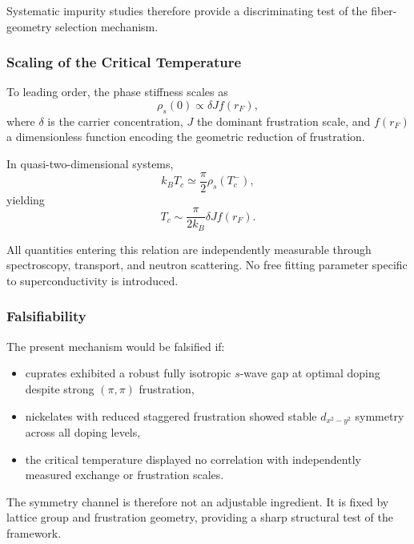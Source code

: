     Systematic impurity studies therefore provide a discriminating test
    of the fiber-geometry selection mechanism.

  \subsubsection*{Scaling of the Critical Temperature}

    To leading order, the phase stiffness scales as
    \begin{equation}
      \rho_s(0) \propto \delta J f(r_F),
    \end{equation}
    where $\delta$ is the carrier concentration, $J$ the dominant
    frustration scale, and $f(r_F)$ a dimensionless function encoding
    the geometric reduction of frustration.

    In quasi-two-dimensional systems,
    \begin{equation}
      k_B T_c \simeq \frac{\pi}{2} \rho_s(T_c^-),
    \end{equation}
    yielding
    \begin{equation}
      T_c \sim \frac{\pi}{2k_B} \delta J f(r_F).
    \end{equation}

    All quantities entering this relation are independently measurable
    through spectroscopy, transport, and neutron scattering.
    No free fitting parameter specific to superconductivity is introduced.

  \subsubsection*{Falsifiability}

    The present mechanism would be falsified if:

    \begin{itemize}
      \item cuprates exhibited a robust fully isotropic $s$-wave gap
      at optimal doping despite strong $(\pi,\pi)$ frustration,
      \item nickelates with reduced staggered frustration showed
      stable $d_{x^2-y^2}$ symmetry across all doping levels,
      \item the critical temperature displayed no correlation with
      independently measured exchange or frustration scales.
    \end{itemize}

    The symmetry channel is therefore not an adjustable ingredient.
    It is fixed by lattice group and frustration geometry,
    providing a sharp structural test of the framework.
